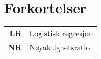 \chapter*{Forkortelser}

\begin{tabular}{>{\bfseries}rl}
       LR & Logistisk regresjon \\
       NR  & Nøyaktighetsratio  \\
\end{tabular}